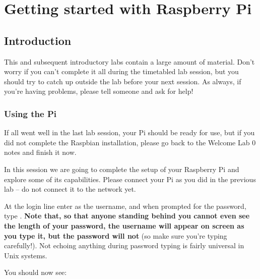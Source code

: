  \chapter{Getting started with Raspberry Pi}

 \minitoc



\section{Introduction}

 This and subsequent introductory labs contain a large amount of material. Don't worry if you can't complete it all during the timetabled lab session, but you should try to catch up outside the lab before your next session. As always, if you're having problems, please tell someone and ask for help!

\subsection{Using the Pi}
\label{sec:using-pi}

If all went well in the last lab session, your Pi should be ready for use, but if you did not complete the Raspbian installation, please go back to the Welcome Lab 0 notes and finish it now.

In this session we are going to complete the setup of your Raspberry Pi and explore some of its capabilities. Please connect your Pi as you did in the previous lab -- do not connect it to the network yet.

At the login line enter  as the username, and when prompted for the password, type . \textbf{Note that, so that anyone standing behind you cannot even see the length of your password,  the username will appear on screen as you type it, but the password will not} (so make sure you're typing carefully!). Not echoing anything during password typing is fairly universal in Unix systems.

You should now see:



